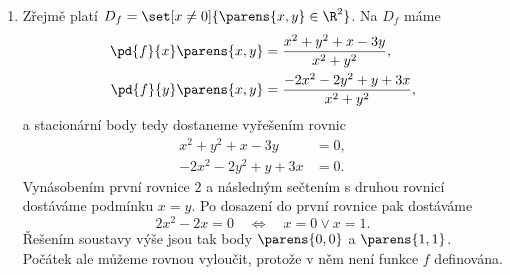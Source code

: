 \documentclass[answers]{exam}
\begin{document}
\begin{questions}
\begin{solution}
\begin{enumerate}[label=(\roman*)]
				V\v simněme si, že platí n\'asleduj\'ic\'i symetrie
				$$f(x,y)=f(-x,-y)=-f(x,-y)=f(-x,y).$$
				Odsud plyne, \v ze sta\v c\'i zkoumat chov\'an\'i funkce $f$ v bod\v e $\parens{\sqrt{\frac{1}{2e}},\sqrt{\frac{1}{2e}}}$. Protože
				\begin{align*}
				 \frac{\partial^2 f}{\partial x^2}\parens{x,y}&=\frac{2xy(x^2+3y^2)}{(x^2+y^2)^2},
				 \\  
				 \frac{\partial^2 f}{\partial y^2}\parens{x,y}&=\frac{2xy(3x^2+y^2)}{(x^2+y^2)^2},
				 \\
				 \frac{\partial^2 f}{\partial y\partial x}\parens{x,y}&=\ln(x^2+y^2)+\frac{2(x^4+y^4)}{(x^2+y^2)^2},
				\end{align*}
				dostáváme, že v bodě $(x,y)=\parens{\sqrt{\frac{1}{2e}},\sqrt{\frac{1}{2e}}}$ je Hessova matice $\mathbb{H}_f$ rovna
				$$
				\mathbb{H}_f \parens{\parens{\sqrt{\frac{1}{2e}},\sqrt{\frac{1}{2e}}}}
				=
				\begin{pmatrix}
				2&0\\
				0&2\\
				\end{pmatrix}
				.$$
				Jedn\'a se evidentn\v e o positivn\v e definitn\'i matici a tedy $f$ m\'a v bod\v e $\parens{\sqrt{\frac{1}{2e}},\sqrt{\frac{1}{2e}}}$ lok\'aln\'i minimum. To sam\'e pak plat\'i i pro bod $\parens{-\sqrt{\frac{1}{2e}},-\sqrt{\frac{1}{2e}}}$. Naopak body $\pm\parens{\sqrt{\frac{1}{2e}},-\sqrt{\frac{1}{2e}}}$ jsou lok\'aln\'i maxima.
				
			\item
			
				Zřejmě platí $D_f = \set[x \neq 0]{\parens{x, y} \in \R^2}$. Na $D_f$ máme
				\begin{align*}
					\pd{f}{x}\parens{x, y}
					&=
					\frac{x^2 + y^2 + x - 3y}{x^2 + y^2},
					\\
					\pd{f}{y}\parens{x, y}
					&=
					\frac{-2x^2 - 2y^2 + y + 3x}{x^2 + y^2},
				\end{align*}
				a stacionární body tedy dostaneme vyřešením rovnic
				\begin{align*}
					x^2 + y^2 + x - 3y &= 0,
					\\
					-2x^2 - 2y^2 + y + 3x &= 0.
				\end{align*}
				Vynásobením první rovnice $2$ a následným sečtením s druhou rovnicí dostáváme podmínku $x = y$. Po dosazení do první rovnice pak dostáváme
				\begin{equation*}
					2 x^2 - 2x = 0 \quad \iff \quad x = 0 \lor x = 1.
				\end{equation*}
				Řešením soustavy výše jsou tak body $\parens{0, 0}$ a $\parens{1, 1}$. Počátek ale můžeme rovnou vyloučit, protože v něm není funkce $f$ definována.
				

\end{enumerate}
\end{solution}
\end{questions}
\end{document}
